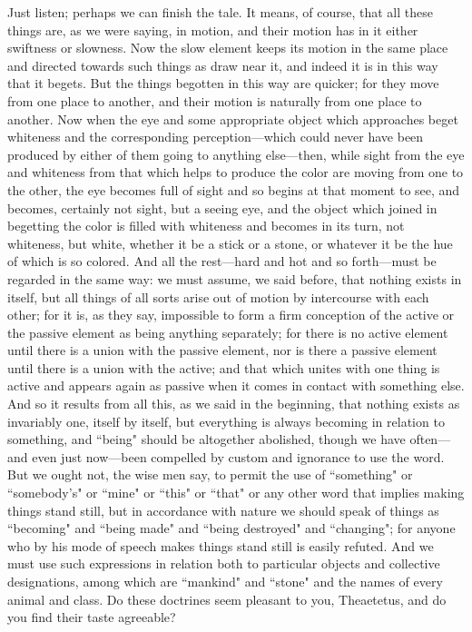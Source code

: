 \documentclass[letterpaper,12pt]{article}
\newcommand{\stephpag}[1]{\marginnote{\small\itshape\fontfamily{ppl}\selectfont #1}}
\begin{document}
\begin{drama}
Just listen; perhaps we can finish the tale. It means, of course, that all these things are, as we were saying, in motion, and their motion has in it either swiftness or slowness. Now the slow element keeps its motion in the same place and directed towards such things as draw near it, and indeed it is in this way that it begets. \stephpag{d} But the things begotten in this way are quicker; for they move from one place to another, and their motion is naturally from one place to another. Now when the eye and some appropriate object which approaches beget whiteness and the corresponding perception—which could never have been produced by either of them going to anything else—then, while sight from the eye and \stephpag{e} whiteness from that which helps to produce the color are moving from one to the other, the eye becomes full of sight and so begins at that moment to see, and becomes, certainly not sight, but a seeing eye, and the object which joined in begetting the color is filled with whiteness and becomes in its turn, not whiteness, but white, whether it be a stick or a stone, or whatever it be the hue of which is so colored. And all the rest—hard and hot and so forth—must be regarded in the same way: we must assume, \stephpag{157 a} we said before, that nothing exists in itself, but all things of all sorts arise out of motion by intercourse with each other; for it is, as they say, impossible to form a firm conception of the active or the passive element as being anything separately; for there is no active element until there is a union with the passive element, nor is there a passive element until there is a union with the active; and that which unites with one thing is active and appears again as passive when it comes in contact with something else. And so it results from all this, as we said in the beginning, that nothing exists as invariably one, itself by itself, but everything is always becoming in relation to something, and ``being" should be altogether abolished, \stephpag{b} though we have often—and even just now—been compelled by custom and ignorance to use the word. But we ought not, the wise men say, to permit the use of ``something" or ``somebody's" or ``mine" or ``this" or ``that" or any other word that implies making things stand still, but in accordance with nature we should speak of things as ``becoming" and ``being made" and ``being destroyed" and ``changing"; for anyone who by his mode of speech makes things stand still is easily refuted. And we must use such expressions in relation both to particular objects and collective designations, among which are \stephpag{c} ``mankind" and ``stone" and the names of every animal and class. Do these doctrines seem pleasant to you, Theaetetus, and do you find their taste agreeable?

\end{drama}
\end{document}
